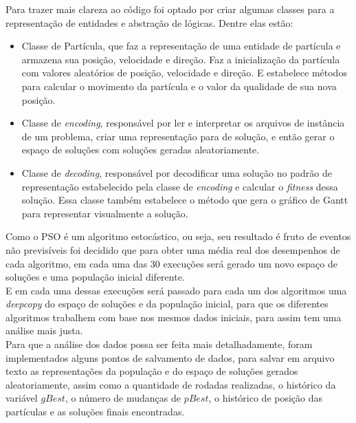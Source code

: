 Para trazer mais clareza ao código foi optado por criar algumas classes para a representação de entidades e abstração de lógicas. Dentre elas estão:
\begin{itemize}
    \item Classe de Partícula, que faz a representação de uma entidade de partícula e armazena sua posição, velocidade e direção. Faz a inicialização da partícula com valores aleatórios de posição, velocidade e direção. E estabelece métodos para calcular o movimento da partícula e o valor da qualidade de sua nova posição.

    \item Classe de \textit{encoding}, responsável por ler e interpretar os arquivos de instância de um problema, criar uma representação para de solução, e então gerar o espaço de soluções com soluções geradas aleatoriamente.

    \item Classe de \textit{decoding}, responsável por decodificar uma solução no padrão de representação estabelecido pela classe de \textit{encoding} e calcular o \textit{fitness} dessa solução. Essa classe também estabelece o método que gera o gráfico de Gantt para representar visualmente a solução.
\end{itemize}

\indent Como o PSO é um algoritmo estocástico, ou seja, seu resultado é fruto de eventos não previsíveis foi decidido que para obter uma média real dos desempenhos de cada algoritmo, em cada uma das 30 execuções será gerado um novo espaço de soluções e uma população inicial diferente.\\
\indent E em cada uma dessas execuções será passado para cada um dos algoritmos uma \textit{deepcopy} do espaço de soluções e da população inicial, para que os diferentes algoritmos trabalhem com base nos mesmos dados iniciais, para assim tem uma análise mais justa.\\
\indent Para que a análise dos dados possa ser feita mais detalhadamente, foram implementados alguns pontos de salvamento de dados, para salvar em arquivo texto as representações da população e do espaço de soluções gerados aleatoriamente, assim como a quantidade de rodadas realizadas, o histórico da variável $gBest$, o número de mudanças de $pBest$, o histórico de posição das partículas e as soluções finais encontradas.
%
    

